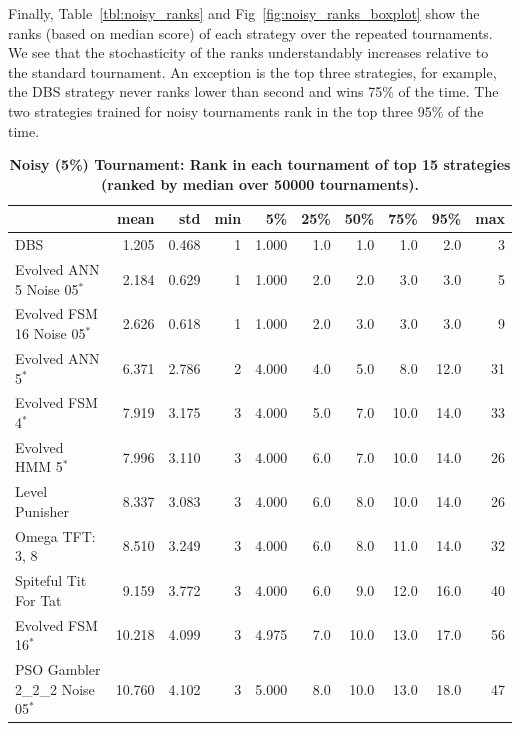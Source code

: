 \documentclass[10pt,letterpaper]{article}
\begin{document}
Finally, Table~\ref{tbl:noisy_ranks} and
Fig~\ref{fig:noisy_ranks_boxplot} show the ranks (based on median score)
of each strategy over the repeated tournaments. We see that the stochasticity
of the ranks understandably increases relative to the standard tournament. An
exception is the top three strategies, for example, the DBS strategy never ranks
lower than
second and wins 75\% of the time. The two strategies trained for noisy
tournaments rank in the top three 95\% of the time.

\begin{table}[!hbtp]
    \centering
        \caption{\bf Noisy (5\%) Tournament: Rank in each tournament
        of top 15 strategies (ranked by median over
        50000 tournaments).}
        \footnotesize
\begin{tabular}{lrrrrrrrrr}
\toprule
{} &    mean &    std &  min &      5\% &   25\% &   50\% &   75\% &   95\% &  max \\
\midrule
DBS                              &   1.205 &  0.468 &    1 &   1.000 &   1.0 &   1.0 &   1.0 &   2.0 &    3 \\
Evolved ANN 5 Noise 05$^{*}$     &   2.184 &  0.629 &    1 &   1.000 &   2.0 &   2.0 &   3.0 &   3.0 &    5 \\
Evolved FSM 16 Noise 05$^{*}$    &   2.626 &  0.618 &    1 &   1.000 &   2.0 &   3.0 &   3.0 &   3.0 &    9 \\
Evolved ANN 5$^{*}$              &   6.371 &  2.786 &    2 &   4.000 &   4.0 &   5.0 &   8.0 &  12.0 &   31 \\
Evolved FSM 4$^{*}$              &   7.919 &  3.175 &    3 &   4.000 &   5.0 &   7.0 &  10.0 &  14.0 &   33 \\
Evolved HMM 5$^{*}$              &   7.996 &  3.110 &    3 &   4.000 &   6.0 &   7.0 &  10.0 &  14.0 &   26 \\
Level Punisher                   &   8.337 &  3.083 &    3 &   4.000 &   6.0 &   8.0 &  10.0 &  14.0 &   26 \\
Omega TFT: 3, 8                  &   8.510 &  3.249 &    3 &   4.000 &   6.0 &   8.0 &  11.0 &  14.0 &   32 \\
Spiteful Tit For Tat             &   9.159 &  3.772 &    3 &   4.000 &   6.0 &   9.0 &  12.0 &  16.0 &   40 \\
Evolved FSM 16$^{*}$             &  10.218 &  4.099 &    3 &   4.975 &   7.0 &  10.0 &  13.0 &  17.0 &   56 \\
PSO Gambler 2\_2\_2 Noise 05$^{*}$ &  10.760 &  4.102 &    3 &   5.000 &   8.0 &  10.0 &  13.0 &  18.0 &   47 \\

\end{tabular}
\end{table}
\end{document}
